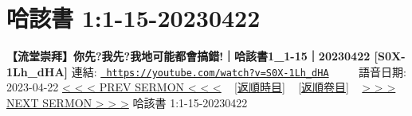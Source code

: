 \documentclass{book}
\begin{document}
\section{哈該書 1:1-15-20230422}
\label{sec:S0X_1Lh_dHA}
\textbf{【流堂崇拜】你先?我先?我地可能都會搞錯!｜哈該書1\_1-15｜20230422 [S0X-1Lh\_dHA]}
\newline
\newline
連結: \href{https://youtube.com/watch?v=S0X-1Lh_dHA}{\texttt{ https://youtube.com/watch?v=S0X-1Lh\_dHA}} ~~~~ 語音日期: 2023-04-22 
\newline
\newline
\hyperref[sec:3PY1nwdp_0k]{\small{< < < PREV SERMON < < <}}
~
\hyperref[sec:index_chronic]{\small{[返順時目]}}
~
\hyperref[sec:index_scriptual]{\small{[返順卷目]}}
~
\hyperref[sec:VNZbDAiXlG0]{\small{> > > NEXT SERMON > > >}}
\newline
\newline
哈該書 1:1-15-20230422
\newline
\end{document}

